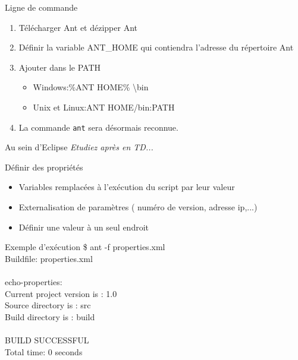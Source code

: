\documentclass[handout]{beamer}
\begin{document}
\begin{frame}
  	\begin{block}{Ligne de commande}
		\begin{enumerate}
			\item Télécharger Ant et dézipper Ant
			\item Définir la variable ANT\_HOME qui contiendra l'adresse du répertoire Ant
			\item Ajouter dans le PATH 
			\begin{itemize}
 				\item Windows:\%ANT \textunderscore HOME\% \textbackslash bin
				\item Unix et Linux:\textdollar \textbraceleft ANT \textunderscore HOME\textbraceright /bin:\textbraceleft PATH\textbraceright
			\end{itemize}
			\item La commande \texttt{ant} sera désormais reconnue.
		\end{enumerate}
  	\end{block}

 	\begin{block}{Au sein d'Eclipse}
 	 	\textit{Etudiez après en TD...}
 	\end{block}
\end{frame}

\begin{frame}
	\begin{block}{Définir des propriétés}
		\begin{itemize}
			\item Variables remplacées à l'exécution du script par leur valeur
			\item Externalisation de paramètres ( numéro de version, adresse ip,...)
			\item Définir une valeur à un seul endroit
		\end{itemize}
		
	\end{block}
	\begin{block}{Exemple d'exécution}
\$ ant -f properties.xml\\
Buildfile: properties.xml\\
\\
echo-properties:\\
     [echo] Current project version is : 1.0\\
     [echo] Source directory is : src\\
     [echo] Build directory is : build\\
\\
BUILD SUCCESSFUL\\
Total time: 0 seconds\\
	\end{block}
\end{frame}
\end{document}
